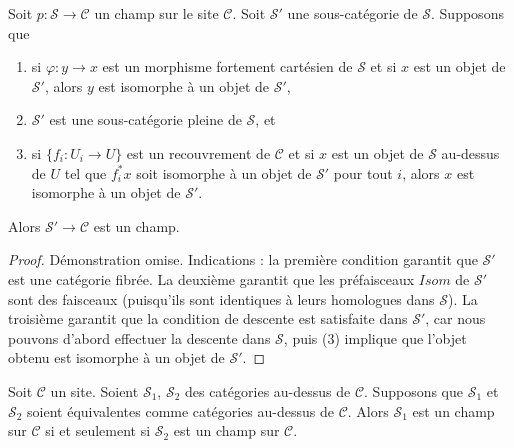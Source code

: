 \begin{lemma}
\label{lemma-substack}
Soit $p : \mathcal{S} \to \mathcal{C}$ un champ sur le site $\mathcal{C}$.
Soit $\mathcal{S}'$ une sous-catégorie de $\mathcal{S}$.
Supposons que
\begin{enumerate}
\item si $\varphi : y \to x$ est un morphisme fortement cartésien
de $\mathcal{S}$ et si
$x$ est un objet de $\mathcal{S}'$, alors $y$ est isomorphe à un
objet de $\mathcal{S}'$,
\item $\mathcal{S}'$ est une sous-catégorie pleine de $\mathcal{S}$, et
\item si $\{f_i : U_i \to U\}$ est un recouvrement de $\mathcal{C}$
et si $x$ est un objet de $\mathcal{S}$ au-dessus de $U$ tel que $f_i^*x$
soit isomorphe à un objet de $\mathcal{S}'$ pour tout $i$,
alors $x$ est isomorphe à un objet de $\mathcal{S}'$.
\end{enumerate}
Alors $\mathcal{S}' \to \mathcal{C}$ est un champ.
\end{lemma}

\begin{proof}
Démonstration omise. Indications :
la première condition garantit que $\mathcal{S}'$ est une catégorie fibrée.
La deuxième garantit que les préfaisceaux $\mathit{Isom}$
de $\mathcal{S}'$ sont des faisceaux (puisqu'ils sont identiques à leurs homologues
dans $\mathcal{S}$). La troisième garantit que la condition de descente
est satisfaite dans $\mathcal{S}'$, car nous pouvons d'abord effectuer la descente dans
$\mathcal{S}$, puis (3) implique que l'objet obtenu est isomorphe à un objet de
$\mathcal{S}'$.
\end{proof}

\begin{lemma}
\label{lemma-stack-equivalent}
Soit $\mathcal{C}$ un site.
Soient $\mathcal{S}_1$, $\mathcal{S}_2$ des catégories au-dessus de $\mathcal{C}$.
Supposons que $\mathcal{S}_1$ et $\mathcal{S}_2$ soient équivalentes
comme catégories au-dessus de $\mathcal{C}$.
Alors $\mathcal{S}_1$ est un champ sur $\mathcal{C}$ si et seulement si
$\mathcal{S}_2$ est un champ sur $\mathcal{C}$.
\end{lemma}

